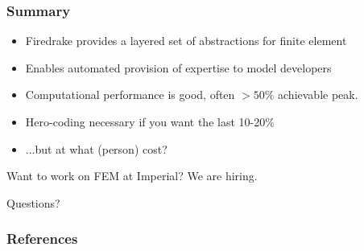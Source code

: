 \documentclass[presentation]{beamer}
\begin{document}
\begin{frame}
  \frametitle{Summary}
  \begin{itemize}
  \item Firedrake provides a layered set of abstractions for finite
    element
  \item Enables automated provision of expertise to model developers
  \item Computational performance is good, often $>50\%$ achievable
    peak.
  \item Hero-coding necessary if you want the last 10-20\%
  \item ...but at what (person) cost?
  \end{itemize}
\end{frame}
\begin{frame}[standout]
  Want to work on FEM at Imperial?  We are hiring.
\end{frame}
\begin{frame}[standout]
  Questions?
\end{frame}

\appendix
\begin{frame}[t]
  \frametitle{References}
  \printbibliography[heading=none]
\end{frame}
\end{document}
